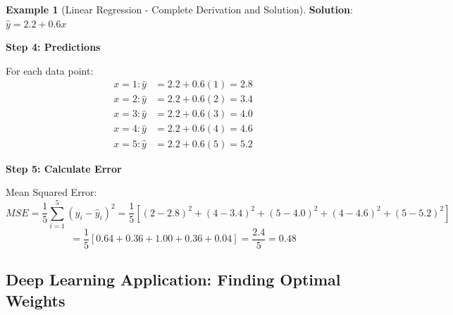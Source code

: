 \documentclass[12pt,a4paper]{article}
\theoremstyle{definition}
\newtheorem{example}{Example}[section]
\begin{document}
\begin{example}[Linear Regression - Complete Derivation and Solution]
\textbf{Solution}: $\hat{y} = 2.2 + 0.6x$

\textbf{Step 4: Predictions}

For each data point:
\begin{align*}
x = 1: \hat{y} &= 2.2 + 0.6(1) = 2.8 \\
x = 2: \hat{y} &= 2.2 + 0.6(2) = 3.4 \\
x = 3: \hat{y} &= 2.2 + 0.6(3) = 4.0 \\
x = 4: \hat{y} &= 2.2 + 0.6(4) = 4.6 \\
x = 5: \hat{y} &= 2.2 + 0.6(5) = 5.2
\end{align*}

\textbf{Step 5: Calculate Error}

Mean Squared Error:
\[
MSE = \frac{1}{5}\sum_{i=1}^{5}(y_i - \hat{y}_i)^2 = \frac{1}{5}[(2-2.8)^2 + (4-3.4)^2 + (5-4.0)^2 + (4-4.6)^2 + (5-5.2)^2]
\]
\[
= \frac{1}{5}[0.64 + 0.36 + 1.00 + 0.36 + 0.04] = \frac{2.4}{5} = 0.48
\]
\end{example}

\subsection{Deep Learning Application: Finding Optimal Weights}
\end{document}
